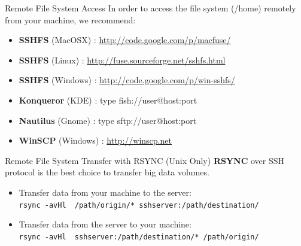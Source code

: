 \documentclass[final,t]{beamer}
\begin{document}
\begin{frame}[fragile]{}
\begin{columns}[t]
\begin{column}{.32\linewidth}
      \begin{block}{Remote File System Access}
       In order to access the file system (/home) remotely from your machine, we recommend:
        \begin{itemize}
        \item \textbf{SSHFS} (MacOSX) : \url{http://code.google.com/p/macfuse/}
        \item \textbf{SSHFS} (Linux) : \url{http://fuse.sourceforge.net/sshfs.html}
        \item \textbf{SSHFS} (Windows) : \url{http://code.google.com/p/win-sshfs/}
        \item \textbf{Konqueror} (KDE) : type fish://user@host:port
        \item \textbf{Nautilus} (Gnome) : type sftp://user@host:port
        \item \textbf{WinSCP} (Windows) : \url{http://winscp.net}
        \end{itemize}
      \end{block}
 
      \begin{block}{Remote File System Transfer with RSYNC (Unix Only)}
       \textbf{RSYNC} over SSH protocol is the best choice to transfer big data volumes.
        \begin{itemize}
        \item Transfer data from your machine to the server:\\ \verb|rsync -avHl  /path/origin/* sshserver:/path/destination/|
        \item Transfer data from the server to your machine:\\ \verb|rsync -avHl  sshserver:/path/destination/* /path/origin/|
        \end{itemize}
      \end{block}


\end{column}
\end{columns}
\end{frame}
\end{document}
